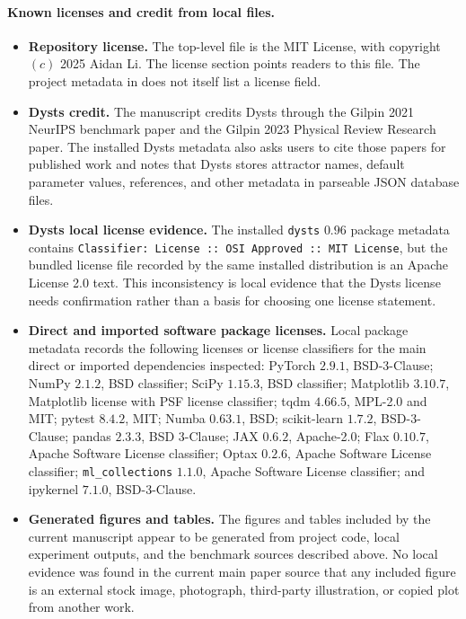 \paragraph{Known licenses and credit from local files.}
\begin{itemize}
  \item \textbf{Repository license.}
  The top-level  file is the MIT License, with copyright
  \((c)\) 2025 Aidan Li. The  license section points readers to
  this file. The project metadata in  does not itself list
  a license field.

  \item \textbf{Dysts credit.}
  The manuscript credits Dysts through the Gilpin 2021 NeurIPS benchmark paper
  and the Gilpin 2023 Physical Review Research paper. The installed Dysts
  metadata also asks users to cite those papers for published work and notes
  that Dysts stores attractor names, default parameter values, references, and
  other metadata in parseable JSON database files.

  \item \textbf{Dysts local license evidence.}
  The installed \texttt{dysts} \(0.96\) package metadata contains
  \texttt{Classifier: License :: OSI Approved :: MIT License}, but the bundled
  license file recorded by the same installed distribution is an Apache License
  2.0 text. This inconsistency is local evidence that the Dysts license needs
  confirmation rather than a basis for choosing one license statement.

  \item \textbf{Direct and imported software package licenses.}
  Local package metadata records the following licenses or license classifiers
  for the main direct or imported dependencies inspected: PyTorch \(2.9.1\),
  BSD-3-Clause; NumPy \(2.1.2\), BSD classifier; SciPy \(1.15.3\), BSD
  classifier; Matplotlib \(3.10.7\), Matplotlib license with PSF license
  classifier; tqdm \(4.66.5\), MPL-2.0 and MIT; pytest \(8.4.2\), MIT; Numba
  \(0.63.1\), BSD; scikit-learn \(1.7.2\), BSD-3-Clause; pandas \(2.3.3\),
  BSD 3-Clause; JAX \(0.6.2\), Apache-2.0; Flax \(0.10.7\), Apache Software
  License classifier; Optax \(0.2.6\), Apache Software License classifier;
  \texttt{ml\_collections} \(1.1.0\), Apache Software License classifier; and
  ipykernel \(7.1.0\), BSD-3-Clause.

  \item \textbf{Generated figures and tables.}
  The figures and tables included by the current manuscript appear to be
  generated from project code, local experiment outputs, and the benchmark
  sources described above. No local evidence was found in the current main
  paper source that any included figure is an external stock image, photograph,
  third-party illustration, or copied plot from another work.


\end{itemize}
